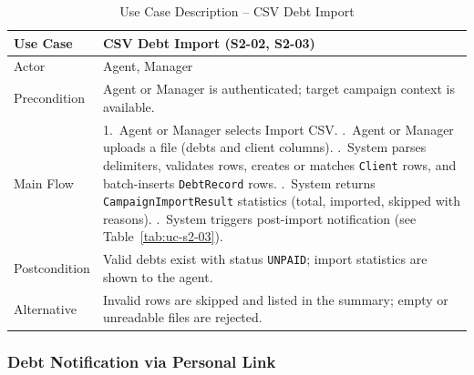 \documentclass[12pt,a4paper]{report}
\newcommand{\reporttablesetup}{%
  \small%
  \setlength{\tabcolsep}{5pt}%
  \renewcommand{\arraystretch}{1.22}%
  \arrayrulecolor{framegray}%
}
\begin{document}
\begin{table}[H]
  \centering
  \reporttablesetup
  \begin{tabularx}{\textwidth}{|p{3.1cm}|Y|}
    \hline
    Use Case     & CSV Debt Import (S2-02, S2-03) \\
    \hline
    Actor        & Agent, Manager \\
    \hline
    Precondition & Agent or Manager is authenticated; target campaign context is
                   available. \\
    \hline
    Main Flow    & 1.\ Agent or Manager selects Import CSV. .\ Agent or Manager uploads a file (debts and client columns).
                       .\ System parses delimiters, validates rows, creates or matches
                       \texttt{Client} rows, and batch-inserts \texttt{DebtRecord}
                       rows. .\ System returns \texttt{CampaignImportResult} statistics (total,
                       imported, skipped with reasons). .\ System triggers post-import notification (see
                       Table~\ref{tab:uc-s2-03}). \\
    \hline
    Postcondition & Valid debts exist with status \texttt{UNPAID}; import statistics
                   are shown to the agent. \\
    \hline
    Alternative  & Invalid rows are skipped and listed in the summary; empty or
                   unreadable files are rejected. \\
    \hline
  \end{tabularx}
  \caption{Use Case Description -- CSV Debt Import}
  \label{tab:uc-s2-02}
\end{table}

\subsubsection{Debt Notification via Personal Link}
\end{document}
